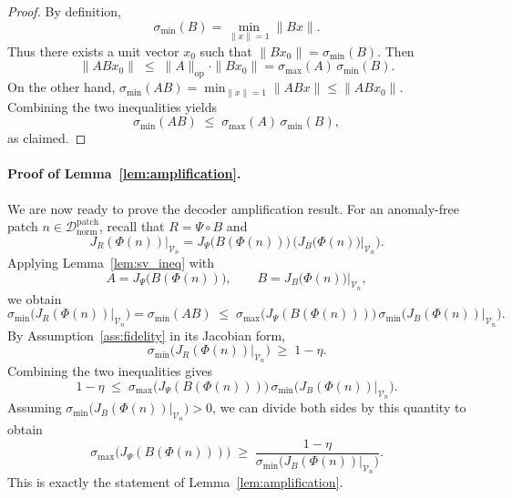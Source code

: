 \documentclass{article}
\theoremstyle{plain}
\theoremstyle{definition}
\theoremstyle{remark}
\begin{document}
\begin{proof}
By definition,
\begin{equation}
    \sigma_{\min}(B) = \min_{\|x\|=1} \|B x\|.
\end{equation}
Thus there exists a unit vector $x_0$ such that
$\|B x_0\| = \sigma_{\min}(B)$. Then
\begin{equation}
    \|A B x_0\|
    \;\le\; \|A\|_{\mathrm{op}} \cdot \|B x_0\|
    = \sigma_{\max}(A)\, \sigma_{\min}(B).
\end{equation}
On the other hand,
$\sigma_{\min}(AB) = \min_{\|x\|=1} \|ABx\| \le \|AB x_0\|$.
Combining the two inequalities yields
\begin{equation}
    \sigma_{\min}(AB)
    \;\le\; \sigma_{\max}(A)\, \sigma_{\min}(B),
\end{equation}
as claimed.
\end{proof}

\paragraph{Proof of Lemma~\ref{lem:amplification}.}
We are now ready to prove the decoder amplification result. For an
anomaly-free patch $n\in\mathcal{D}^{\mathrm{patch}}_{\mathrm{norm}}$,
recall that $R = \Psi\circ B$ and
\begin{equation}
    J_R(\Phi(n))\big|_{\mathcal{V}_n}
    = J_\Psi\big(B(\Phi(n))\big)\,
      \Big(J_B\big(\Phi(n)\big)\big|_{\mathcal{V}_n}\Big).
\end{equation}
Applying Lemma~\ref{lem:sv_ineq} with
\begin{equation}
    A = J_\Psi\big(B(\Phi(n))\big),
    \qquad
    B = J_B\big(\Phi(n)\big)\big|_{\mathcal{V}_n},
\end{equation}
we obtain
\begin{equation}
    \sigma_{\min}\big(J_R(\Phi(n))\big|_{\mathcal{V}_n}\big)
    = \sigma_{\min}(AB)
    \;\le\;
    \sigma_{\max}\big(J_\Psi(B(\Phi(n)))\big)\,
    \sigma_{\min}\big(J_B(\Phi(n))\big|_{\mathcal{V}_n}\big).
\end{equation}
By Assumption~\ref{ass:fidelity} in its Jacobian form,
\begin{equation}
    \sigma_{\min}\big(J_R(\Phi(n))\big|_{\mathcal{V}_n}\big)
    \;\ge\; 1 - \eta.
\end{equation}
Combining the two inequalities gives
\begin{equation}
    1 - \eta
    \;\le\;
    \sigma_{\max}\big(J_\Psi(B(\Phi(n)))\big)\,
    \sigma_{\min}\big(J_B(\Phi(n))\big|_{\mathcal{V}_n}\big).
\end{equation}
Assuming
$\sigma_{\min}\big(J_B(\Phi(n))\big|_{\mathcal{V}_n}\big) > 0$, we can
divide both sides by this quantity to obtain
\begin{equation}
    \sigma_{\max}\big(J_\Psi(B(\Phi(n)))\big)
    \;\ge\;
    \frac{1-\eta}{
    \sigma_{\min}\big(J_B(\Phi(n))\big|_{\mathcal{V}_n}\big)}.
    \label{eq:amplification_bound}
\end{equation}
This is exactly the statement of Lemma~\ref{lem:amplification}.
\end{document}
